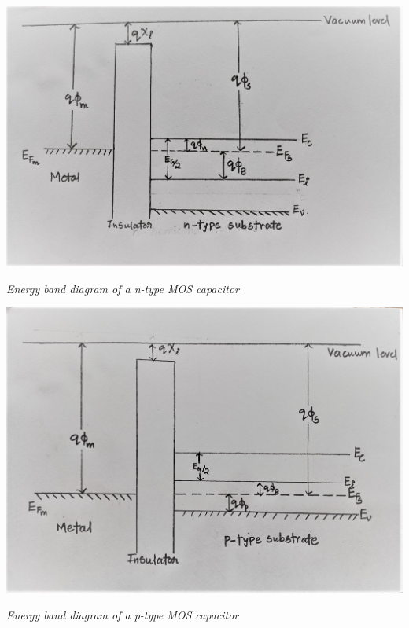 \documentclass[12 pt]{article}
\begin{document}
\par
\begin{center}
    \includegraphics{MOS_energy_band_1.jpg}
\end{center}
\begin{center}
    \emph{\hspace{1.75 cm}Energy band diagram of a n-type MOS capacitor\newline}
\end{center}
\par

\par
\begin{center}
    \includegraphics{MOS_energy_band_2.jpg}
\end{center}
\begin{center}
    \emph{\hspace{1.75 cm}Energy band diagram of a p-type MOS capacitor\newline}
\end{center}
\par
\end{document}
